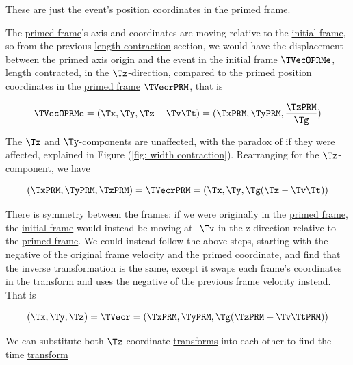 These are just the \hyperlink{def-event}{event}'s position coordinates in the \hyperlink{def-Primed-Frame}{primed frame}.

The \hyperlink{def-Primed-Frame}{primed frame}'s axis and coordinates are moving relative to the \hyperlink{def-initial-Frame}{initial frame}, so from the previous \hyperlink{def-length-contraction}{length contraction} section, we would have the displacement between the primed axis origin and the \hyperlink{def-event}{event} in the \hyperlink{def-initial-Frame}{initial frame} $\TVecOPRMe$, length contracted, in the $\Tz $-direction, compared to the primed position coordinates in the \hyperlink{def-Primed-Frame}{primed frame} ${\TVecrPRM  }$, that is

\begin{equation}
	\TVecOPRMe = ({\Tx },{\Ty },{\Tz }-{\Tv }{\Tt }) = ({\TxPRM  },{\TyPRM  },\frac{\TzPRM  }{\Tg })
\end{equation}

The $\Tx $ and $\Ty $-components are unaffected, with the paradox of if they were affected, explained in Figure (\ref{fig: width contraction}).
Rearranging for the $\Tz $-component, we have

\begin{equation}
	({\TxPRM  },{\TyPRM  },{\TzPRM  }) = {\TVecrPRM  } = ({\Tx },{\Ty },{\Tg }({\Tz }-{\Tv }{\Tt }) )
\end{equation}

There is symmetry between the frames: if we were originally in the \hyperlink{def-Primed-Frame}{primed frame}, the \hyperlink{def-initial-Frame}{initial frame} would instead be moving at -${\Tv }$ in the z-direction relative to the \hyperlink{def-Primed-Frame}{primed frame}.
We could instead follow the above steps, starting with the negative of the original frame velocity and the primed coordinate, and find that the inverse \hyperlink{def-transform}{transformation} is the same, except it swaps each frame's coordinates in the transform and uses the negative of the previous \hyperlink{def-frame-velocity}{frame velocity} instead.
That is

\begin{equation}
	({\Tx },{\Ty },{\Tz }) = {\TVecr  } = ({\TxPRM  },{\TyPRM  },{\Tg }({\TzPRM  }+{\Tv }\TtPRM ) )
\end{equation}

We can substitute both $\Tz $-coordinate \hyperlink{def-transform}{transforms} into each other to find the time \hyperlink{def-transform}{transform}

